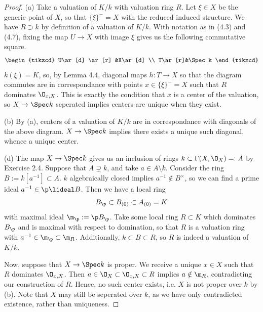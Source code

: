 \documentclass[12pt]{amsart}
\begin{document}
\begin{proof}
  (a) Take a valuation of $K/k$ with valuation ring $R$.
  Let $\xi\in X$ be the generic point of $X$, so that $\{\xi\}^-=X$ with the reduced induced structure.
  We have $R\supset k$ by definition of a valuation of $K/k$.
  With notation as in (4.3) and (4.7), fixing the map $U\to X$ with image $\xi$ gives us the following commutative square.
  \[
    \begin{tikzcd}
      U\ar[d] \ar[r] &X\ar[d] \\
      T\ar[r]&\Spec k
    \end{tikzcd}
  \] 
  $k(\xi)=K$, so, by Lemma 4.4, diagonal maps $h:T\to X$ so that the diagram commutes are in correspondance with points $x\in \{\xi\}^-=X$ such that $R$ dominates $\O_{x,X}$.
  This is exactly the condition that $x$ is a center of the valuation, so $X\to \Spec k$ seperated implies centers are unique when they exist.
  
  (b) By (a), centers of a valuation of $K/k$ are in correspondance with diagonals of the above diagram. 
  $X\to \Spec k$ implies there exists a unique such diagonal, whence a unique center.


  (d) The map $X\to \Spec k$ gives us an inclusion of rings $k\subset \Gamma(X,\O_X)=:A$ by Exercise 2.4.
  Suppose that $A\supsetneq k$, and take $a\in A\setminus k$.
  Consider the ring $B:=k[a^{-1}]\subset A$.
  $k$ algebraically closed implies $a^{-1}\notin B^\times$, so we can find a prime ideal $a^{-1}\in\p\lideal B$.
  Then we have a local ring 
  \[
    B_\p\subset B_{(0)}\subset A_{(0)}= K
  \]
  with maximal ideal $\m_\p:=\p B_\p$.
  Take some local ring $R\subset K$ which dominates $B_\p$ and is maximal with respect to domination, so that $R$ is a valuation ring with $a^{-1}\in \m_\p\subset\m_R$.
  Additionally, $k\subset B\subset R$, so $R$ is indeed a valuation of $K/k$.

  Now, suppose that $X\to\Spec k$ is proper.
  We receive a unique $x\in X$ such that $R$ dominates $\O_{x,X}$.
  Then $a\in \O_X\subset \O_{x,X}\subset R$ implies $a\notin \m_R$, contradicting our construction of $R$.
  Hence, no such center exists, i.e. $X$ is not proper over $k$ by (b).
  Note that $X$ may still be seperated over $k$, as we have only contradicted existence, rather than uniqueness.
\end{proof}
\end{document}
